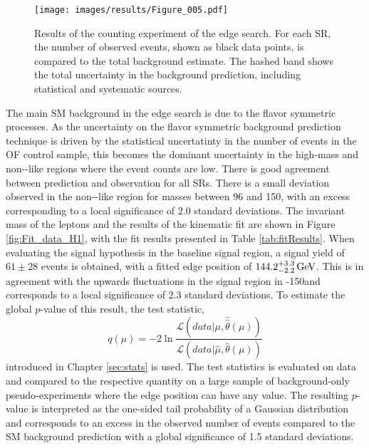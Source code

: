 \begin{figure}[htbp!]
\begin{center}
\texttt{[image: images/results/Figure\_005.pdf]}
\caption{Results of the counting experiment of the edge search. For each SR, the number of observed events, shown as black data points, is compared to the total background estimate.  The hashed band shows the total uncertainty in the background prediction, including statistical and systematic sources.}
\label{fig:resultsEdge}
\end{center}
\end{figure}                                                                                                                                                               
The main SM background in the edge search is due to the flavor symmetric processes. 
As the uncertainty on the flavor symmetric background prediction technique is driven by the statistical uncertatinty in the number of events in the OF control sample, this becomes the dominant uncertainty in the high-mass and non-\ttbar-like regions where the event counts are low. 
There is good agreement between prediction and observation for all SRs. 
There is a small deviation observed in the non-\ttbar-like region for masses between 96 and 150\GeV, with an excess corresponding to a local significance of 2.0 standard deviations.
The invariant mass of the leptons and the results of the kinematic fit are shown in Figure \ref{fig:Fit_data_H1}, with the fit results presented in Table \ref{tab:fitResults}.
When evaluating the signal hypothesis in the baseline signal region, a signal yield of $61\pm28$ events is obtained, with a fitted edge position of $144.2^{+3.3}_{-2.2}\,\text{Ge\hspace{-.08em}V}$. 
This is in agreement with the upwards fluctuations in the signal region in -150\GeV and corresponds to a local significance of 2.3 standard deviations.
To estimate the global $p$-value \cite{Gross:2010qma} of this result, the test statistic,
\begin{equation}
q(\mu)=-2\ln\frac{\mathcal{L}(data|\mu, \hat{\hat{\theta}}(\mu))}{\mathcal{L}(data|\hat{\mu}, \hat{\theta}(\mu))}
\end{equation}
introduced in Chapter \ref{sec:stats} is used. 
The test statistics is evaluated on data and compared to the respective quantity on a large sample of background-only pseudo-experiments where the edge position can have any value. 
The resulting $p$-value is interpreted as the one-sided tail probability of a Gaussian distribution and corresponds to an excess in the observed number of events compared to the SM background prediction with a global significance of 1.5 standard deviations.
